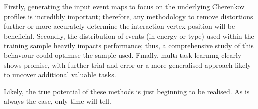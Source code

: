 Firstly, generating the input event maps to focus on the underlying Cherenkov profiles is
incredibly important; therefore, any methodology to remove distortions further or more accurately
determine the interaction vertex position will be beneficial. Secondly, the distribution of events
(in energy or type) used within the training sample heavily impacts performance; thus, a
comprehensive study of this behaviour could optimise the sample used. Finally, multi-task learning
clearly shows promise, with further trial-and-error or a more generalised approach likely to
uncover additional valuable tasks. 

Likely, the true potential of these methods is just beginning to be realised. As is always the
case, only time will tell.